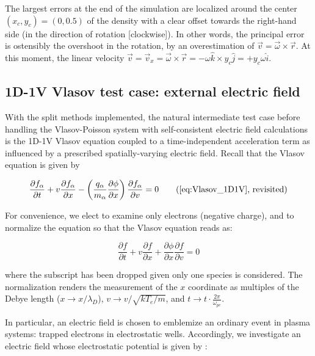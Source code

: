 \documentclass[11pt,titlepage]{report}
\begin{document}
The largest errors at the end of the simulation are localized around the center $(x_c,y_c) = (0,0.5)$ of the density with a clear offset towards the right-hand side (in the direction of rotation [clockwise]). In other words, the principal error is ostensibly the overshoot in the rotation, by an overestimation of $\vec{v} = \vec{\omega} \times \vec{r}$. At this moment, the linear velocity $\vec{v} = \vec{v}_x = \vec{\omega}\times\vec{r} = -\omega\hat{k}\times y_c\hat{j} = +y_c\omega \hat{i}$.


\subsection{1D-1V Vlasov test case: external electric field}\label{sec:1D1V_Vlasov_givenE}

\indent\indent With the split methods implemented, the natural intermediate test case before handling the Vlasov-Poisson system with self-consistent electric field calculations is the 1D-1V Vlasov equation coupled to a time-independent acceleration term as influenced by a prescribed spatially-varying electric field. Recall that the Vlasov equation is given by

\begin{equation*}
\frac{\partial f_{\alpha}}{\partial t} + v\frac{\partial f_{\alpha}}{\partial x} - \left(\frac{q_{\alpha}}{m_{\alpha}}\frac{\partial\phi}{\partial x}\right)\frac{\partial f_{\alpha}}{\partial v} = 0 \tag{\ref{eq:Vlasov_1D1V}, revisited}\end{equation*}

\noindent For convenience, we elect to examine only electrons (negative charge), and to normalize the equation so that the Vlasov equation reads as:

\begin{equation}\frac{\partial f}{\partial t} + v\frac{\partial f}{\partial x} + \frac{\partial\phi}{\partial x}\frac{\partial f}{\partial v} = 0\label{eq:Vlasov_1D1V_normalized}\end{equation}

\noindent where the subscript has been dropped given only one species is considered. The normalization renders the measurement of the $x$ coordinate as multiples of the Debye length ($x\rightarrow x / \lambda_D$), $v \rightarrow v / \sqrt{kT_e / m}$, and $t \rightarrow t \cdot \tfrac{2\pi}{\omega_{pe}}$.

In particular, an electric field is chosen to emblemize an ordinary event in plasma systems: trapped electrons in electrostatic wells. Accordingly, we investigate an electric field whose electrostatic potential is given by \cite{Guclu14}:
\end{document}
